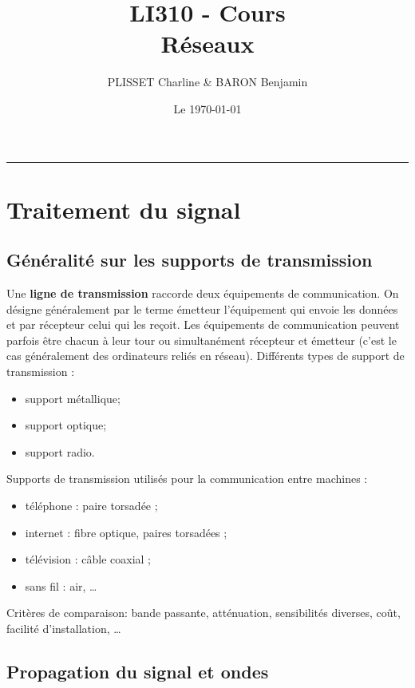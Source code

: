 \documentclass[11pt,english,french]{scrreprt}
\makeatletter
\theoremstyle{remark}
\theoremstyle{definition}
\renewcommand{\maketitle}{\begingroup%
    \let\footnotesize\small
    \let\footnoterule\relax
    \parindent \z@
    \reset@font
    \begin{flushleft}
      \huge \sffamily \bfseries\color{orange} \@title
    \end{flushleft}
    \hrule height 1pt
    \begin{flushright}
      \large\sffamily\color{MyDarkBlue}\@author
    \end{flushright}
  \endgroup%
  \setcounter{footnote}{0}%
}
\makeatother
\begin{document}
\author{PLISSET Charline \& BARON Benjamin }
\date{Le \today}

\title{LI310 - Cours\\
Réseaux}


\maketitle
\tableofcontents

\chapter{Traitement du signal} %

\section{Généralité sur les supports de transmission} %

Une \textbf{ligne de transmission} raccorde deux équipements de communication. On désigne généralement
par le terme émetteur l'équipement qui envoie les données et par récepteur celui qui les reçoit. Les équipements de communication peuvent parfois être chacun à leur tour ou simultanément récepteur et émetteur (c'est le cas généralement des ordinateurs reliés en réseau).
Différents types de support de transmission :\begin{itemize}
	\item support métallique;
	\item support optique;
	\item support radio.
\end{itemize}

\vspace{10pt}
Supports de transmission utilisés pour la communication entre machines :\begin{itemize}
	\item téléphone : paire torsadée ;
	\item internet : fibre optique, paires torsadées ;
	\item télévision : câble coaxial ;
	\item sans fil : air, \dots
\end{itemize}

\vspace{10pt}
Critères de comparaison: bande passante, atténuation, sensibilités diverses, coût, facilité d'installation, \dots

\section{Propagation du signal et ondes} %
\end{document}
